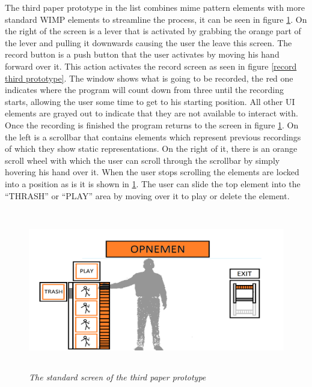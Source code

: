 The third paper prototype in the list combines mime pattern elements with more standard WIMP elements to streamline the process, it can be seen in figure \ref{standard third prototype}. On the right of the screen is a lever that is activated by grabbing the orange part of the lever and pulling it downwards causing the user the leave this screen. The record button is a push button that the user activates by moving his hand forward over it. This action activates the record screen as seen in figure \ref{record third prototype}. The window shows what is going to be recorded, the red one indicates where the program will count down from three until the recording starts, allowing the user some time to get to his starting position. All other UI elements are grayed out to indicate that they are not available to interact with. Once the recording is finished the program returns to the screen in figure \ref{standard third prototype}. On the left is a scrollbar that contains elements which represent previous recordings of which they show static representations. On the right of it, there is an orange scroll wheel with which the user can scroll through the scrollbar by simply hovering his hand over it. When the user stops scrolling the elements are locked into a position as is it is shown in \ref{standard third prototype}. The user can slide the top element into the ``THRASH'' or ``PLAY'' area by moving over it to play or delete the element. 


\begin{figure}[H]
	\begin{center}
		\includegraphics[width=12.5cm, height=7cm]{figures/prototype_5_3_standard.png}
		\caption{\emph{The standard screen of the third paper prototype}}
		\label{standard third prototype}
	\end{center}
\end{figure}

